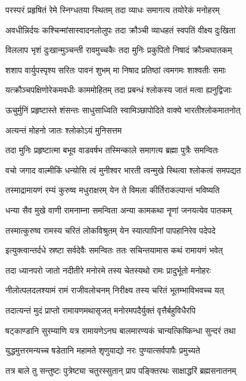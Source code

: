 \twolineshloka
{परस्परं प्रहृषितं रेमे स्निग्धतया स्थितम्}
{तदा व्याधः समागत्य तयोरेकं मनोहरम्}%

\twolineshloka
{अवधीन्निर्दयः कश्चिन्मांसास्वादनलोलुपः}
{तदा क्रौञ्ची व्याधहतं स्वपतिं वीक्ष्य दुःखिता}%

\twolineshloka
{विललाप भृशं दुःखान्मुञ्चन्ती रावमुच्चकैः}
{तदा मुनिः प्रकुपितो निषादं क्रौञ्चघातकम्}%

\twolineshloka
{शशाप वार्युपस्पृश्य सरितः पावनं शुभम्}
{मा निषाद प्रतिष्ठां त्वमगमः शाश्वतीः समाः}%

\twolineshloka
{यत्क्रौञ्चपक्षिणोरेकमवधीः काममोहितम्}
{तदा प्रबन्धं श्लोकस्य जातं मत्वा ह्यनुद्विजाः}%

\twolineshloka
{ऊचुर्मुनिं प्रहृष्टास्ते शंसन्तः साधुसाध्विति}
{स्वामिञ्छापोदिते वाक्ये भारतीश्लोकमातनोत्}%

अत्यन्तं मोहनो जातः श्लोकोऽयं मुनिसत्तम

\twolineshloka
{तदा मुनिः प्रहृष्टात्मा बभूव वाडवर्षभ}
{तस्मिन्काले समागत्य ब्रह्मा पुत्रैः समन्वितः}%

\twolineshloka
{वचो जगाद वाल्मीकिं धन्योसि त्वं मुनीश्वर}
{भारती त्वन्मुखे स्थित्वा श्लोकत्वं समपद्यत}%

\twolineshloka
{तस्माद्रामायणं रम्यं कुरुष्व मधुराक्षरम्}
{येन ते विमला कीर्तिराकल्पान्तं भविष्यति}%

\twolineshloka
{धन्या सैव मुखे वाणी रामनाम्ना समन्विता}
{अन्या कामकथा नॄणां जनयत्येव पातकम्}%

\twolineshloka
{तस्मात्कुरुष्व रामस्य चरितं लोकविश्रुतम्}
{येन स्यात्पापिनां पापहानिरेव पदेपदे}%

\twolineshloka
{इत्युक्त्वान्तर्दधे स्रष्टा सर्वदेवैः समन्वितः}
{ततः सचिन्तयामास कथं रामायणं भवेत्}%

\twolineshloka
{तदा ध्यानपरो जातो नदीतीरे मनोरमे}
{तस्य चेतस्यथो रामः प्रादुर्भूतो मनोहरः}%

\twolineshloka
{नीलोत्पलदलश्यामं रामं राजीवलोचनम्}
{निरीक्ष्य तस्य चरितं भूतम्भाविभवच्च यत्}%

\twolineshloka
{तदात्यन्तं मुदं प्राप्तो रामायणमथासृजत्}
{मनोरमपदैर्युक्तं वृत्तैर्बहुविधैरपि}%

\twolineshloka
{षट्काण्डानि सुरम्याणि यत्र रामायणेऽनघ}
{बालमारण्यकं चान्यत्किष्किन्धा सुन्दरं तथा}%

\twolineshloka
{युद्धमुत्तरमन्यच्च षडेतानि महामते}
{शृणुयाद्यो नरः पुण्यात्सर्वपापैः प्रमुच्यते}%

\twolineshloka
{तत्र बाले तु सन्तुष्टः पुत्रेष्ट्या चतुरस्सुतान्}
{प्राप पङ्क्तिरथः साक्षाद्धरिं ब्रह्मसनातनम्}%

